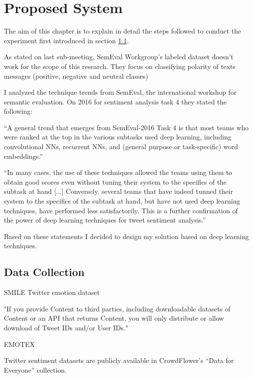 \chapter{Proposed System}

The aim of this chapter is to explain in detail the steps followed to conduct the experiment first introduced in section \ref{}.

\cite{roberts2012empatweet}

As stated on last sub-meeting, SemEval Workgroup's labeled dataset doesn't work for the scope of this research. They focus on classifying polarity of texts messages (positive, negative and neutral classes)

I analyzed the technique trends from SemEval, the international workshop for semantic evaluation. On 2016 for sentiment analysis task 4 they stated the following: 

“A general trend that emerges from SemEval-2016 Task 4 is that most teams who were ranked at the top in the various subtasks used deep learning, including convolutional NNs, recurrent NNs, and (general purpose or task-specific) word embeddings.”

“In many cases, the use of these techniques allowed the teams using them to obtain good scores even without tuning their system to the specifics of the subtask at hand [...] Conversely, several teams that have indeed tunned their system to the specifics of the subtask at hand, but have not used deep learning techniques, have performed less satisfactorily. This is a further confirmation of the power of deep learning techniques for tweet sentiment analysis.”

Based on these statements I decided to design my solution based on deep learning techniques.

\section{Data Collection}

SMILE Twitter emotion dataset\cite{wang2016smile}

"If you provide Content to third parties, including downloadable datasets of Content or an API that returns Content, you will only distribute or allow download of Tweet IDs and/or User IDs."\cite{twitterTOS}

EMOTEX\cite{hasan2014emotex} 

Twitter sentiment datasets are publicly available in CrowdFlower's ``Data for Everyone'' collection\cite{CrowdFlowerDfE}.

